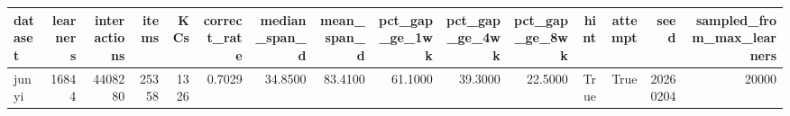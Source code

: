 \begin{tabular}{lrrrrrrrrrrrrrr}
\toprule
dataset & learners & interactions & items & KCs & correct\_rate & median\_span\_d & mean\_span\_d & pct\_gap\_ge\_1wk & pct\_gap\_ge\_4wk & pct\_gap\_ge\_8wk & hint & attempt & seed & sampled\_from\_max\_learners \\
\midrule
junyi & 16844 & 4408280 & 25358 & 1326 & 0.7029 & 34.8500 & 83.4100 & 61.1000 & 39.3000 & 22.5000 & True & True & 20260204 & 20000 \\
\bottomrule
\end{tabular}
